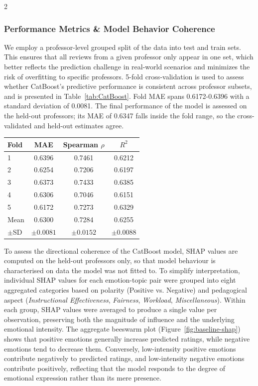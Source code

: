 \documentclass{article}
\begin{document}
\begin{multicols*}{2}
\subsubsection{Performance Metrics \& Model Behavior Coherence}
We employ a professor-level grouped split of the data into test and train sets. This ensures that all reviews from a given professor only appear in one set, which better reflects the prediction challenge in real-world scenarios and minimizes the risk of overfitting to specific professors. 5-fold cross-validation is used to assess whether CatBoost's predictive performance is consistent across professor subsets, and is presented in Table~\ref{tab:CatBoost}. Fold MAE spans 0.6172-0.6396 with a standard deviation of 0.0081. The final performance of the model is assessed on the held-out professors; its MAE of 0.6347 falls inside the fold range, so the cross-validated and held-out estimates agree.
\begin{center}
    \label{tab:CatBoost}
    \begin{tabular}{lccc}
    \toprule
    Fold & MAE & Spearman $\rho$ & $R^2$ \\
    \midrule
    1 & 0.6396 & 0.7461 & 0.6212 \\
    2 & 0.6254 & 0.7206 & 0.6197 \\
    3 & 0.6373 & 0.7433 & 0.6385 \\
    4 & 0.6306 & 0.7046 & 0.6151 \\
    5 & 0.6172 & 0.7273 & 0.6329 \\
    \midrule
    Mean & 0.6300 & 0.7284 & 0.6255 \\
    $\pm$SD & $\pm 0.0081$ & $\pm 0.0152$ & $\pm 0.0088$ \\
    \bottomrule   
    \end{tabular}
\end{center}

To assess the directional coherence of the CatBoost model, SHAP values are computed on the held-out professors only, so that model behaviour is characterised on data the model was not fitted to. To simplify interpretation, individual SHAP values for each emotion-topic pair were grouped into eight aggregated categories based on polarity (Positive vs. Negative) and pedagogical aspect (\textit{Instructional Effectiveness}, \textit{Fairness}, \textit{Workload}, \textit{Miscellaneous}). Within each group, SHAP values were averaged to produce a single value per observation, preserving both the magnitude of influence and the underlying emotional intensity. The aggregate beeswarm plot (Figure~\ref{fig:baseline-shap}) shows that positive emotions generally increase predicted ratings, while negative emotions tend to decrease them. Conversely, low-intensity positive emotions contribute negatively to predicted ratings, and low-intensity negative emotions contribute positively, reflecting that the model responds to the degree of emotional expression rather than its mere presence. 


\end{multicols*}
\end{document}
